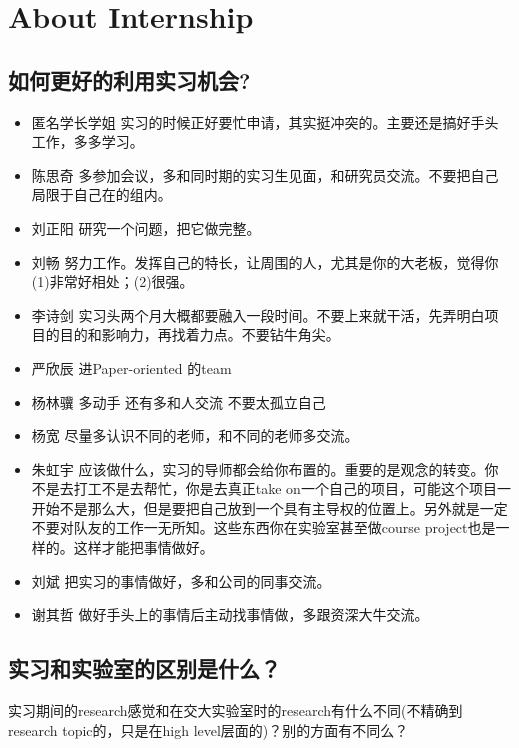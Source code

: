 \documentclass{vivid_layout}
\begin{document}
\section{About Internship}
\addtocounter{section}{1}
\setcounter{subsection}{0}

\subsection{如何更好的利用实习机会?}
\begin{itemize}
\item {\name 匿名学长学姐}  \quad 实习的时候正好要忙申请，其实挺冲突的。主要还是搞好手头工作，多多学习。
\item { 陈思奇} \quad 多参加会议，多和同时期的实习生见面，和研究员交流。不要把自己局限于自己在的组内。
\item  { 刘正阳}  \quad 研究一个问题，把它做完整。
\item  { 刘畅}  \quad 努力工作。发挥自己的特长，让周围的人，尤其是你的大老板，觉得你(1)非常好相处；(2)很强。
\item  { 李诗剑}  \quad 实习头两个月大概都要融入一段时间。不要上来就干活，先弄明白项目的目的和影响力，再找着力点。不要钻牛角尖。
\item  { 严欣辰}  \quad 进Paper-oriented 的team
\item  { 杨林骥}  \quad 多动手 还有多和人交流 不要太孤立自己
\item  { 杨宽}  \quad 尽量多认识不同的老师，和不同的老师多交流。
\item  { 朱虹宇}  \quad 应该做什么，实习的导师都会给你布置的。重要的是观念的转变。你不是去打工不是去帮忙，你是去真正take on一个自己的项目，可能这个项目一开始不是那么大，但是要把自己放到一个具有主导权的位置上。另外就是一定不要对队友的工作一无所知。这些东西你在实验室甚至做course project也是一样的。这样才能把事情做好。
\item  { 刘斌}  \quad 把实习的事情做好，多和公司的同事交流。
\item  { 谢其哲}  \quad 做好手头上的事情后主动找事情做，多跟资深大牛交流。
\end{itemize}

\subsection{实习和实验室的区别是什么？}
实习期间的research感觉和在交大实验室时的research有什么不同(不精确到research topic的，只是在high level层面的)？别的方面有不同么？
\end{document}
